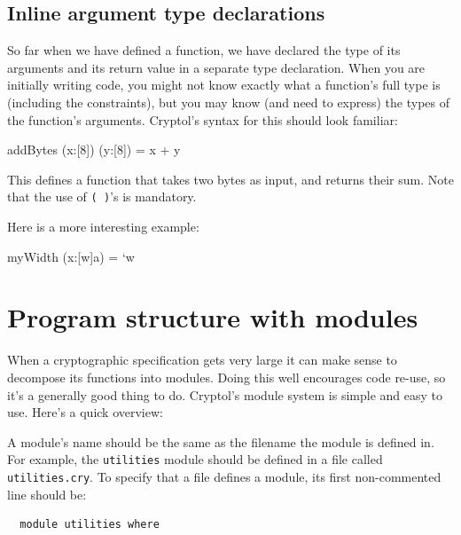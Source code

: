 
\subsection{Inline argument type declarations}\indTypeInline
\label{sec:inline-argument-type}

So far when we have defined a function, we have declared the type of
its arguments and its return value in a separate type declaration.
When you are initially writing code, you might not know exactly what a
function's full type is (including the constraints), but you may know
(and need to express) the types of the function's arguments. Cryptol's
syntax for this should look familiar:
\begin{code}
  addBytes (x:[8]) (y:[8]) = x + y
\end{code}

This defines a function that takes two bytes as input, and returns their sum.
Note that the use of {\tt( )}'s is mandatory.

Here is a more interesting example:
\begin{code}
  myWidth (x:[w]a) = `w
\end{code}


\section{Program structure with modules}

When a cryptographic specification gets very large it can make sense
to decompose its functions into modules.\indModuleSystem\indImport
Doing this well encourages
code re-use, so it's a generally good thing to do. Cryptol's module
system is simple and easy to use. Here's a quick overview:

A module's name should be the same as the filename the module is
defined in. For example, the \verb+utilities+ module should be
defined in a file called \verb+utilities.cry+. To specify that a file
defines a module, its first non-commented line should be:

\begin{verbatim}
  module utilities where
\end{verbatim}


